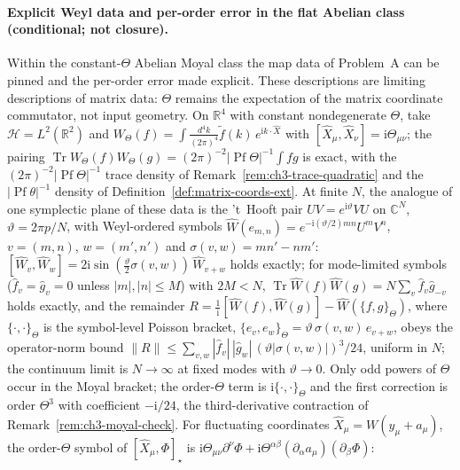 \paragraph{Explicit Weyl data and per-order error in the flat Abelian class (conditional; not closure).}
Within the constant-\(\Theta\) Abelian Moyal class the map data of Problem~A can be
pinned and the per-order error made explicit. These descriptions are limiting
descriptions of matrix data: \(\Theta\) remains the expectation of the matrix coordinate
commutator, not input geometry. On \(\mathbb R^4\) with constant nondegenerate
\(\Theta\), take \(\mathcal H=L^2(\mathbb R^2)\) and
\(W_\Theta(f)=\int\frac{d^4k}{(2\pi)^4}\tilde f(k)\,e^{\mathrm i k\cdot\hat X}\) with
\([\hat X_\mu,\hat X_\nu]=\mathrm i\Theta_{\mu\nu}\); the pairing
\(\operatorname{Tr}W_\Theta(f)W_\Theta(g)=(2\pi)^{-2}|\operatorname{Pf}\Theta|^{-1}\!\int fg\)
is exact, with the \((2\pi)^{-2}|\operatorname{Pf}\Theta|^{-1}\) trace density of
Remark~\ref{rem:ch3-trace-quadratic} and the \(|\operatorname{Pf}\theta|^{-1}\) density of
Definition~\ref{def:matrix-coords-ext}. At finite \(N\), the analogue of one symplectic
plane of these data is the 't~Hooft pair \(UV=e^{\mathrm i\vartheta}VU\) on
\(\mathbb C^N\), \(\vartheta=2\pi p/N\), with Weyl-ordered symbols
\(\widehat W(e_{m,n})=e^{-\mathrm i(\vartheta/2)mn}U^mV^n\), \(v=(m,n)\),
\(w=(m',n')\) and \(\sigma(v,w)=mn'-nm'\):
\([\widehat W_v,\widehat W_w]=2\mathrm i\sin(\tfrac{\vartheta}{2}\sigma(v,w))\,\widehat W_{v+w}\)
holds exactly; for mode-limited symbols (\(\hat f_v=\hat g_v=0\) unless
\(|m|,|n|\le M\)) with \(2M<N\),
\(\operatorname{Tr}\widehat W(f)\widehat W(g)=N\sum_v\hat f_v\hat g_{-v}\) holds exactly,
and the remainder
\(R=\tfrac1{\mathrm i}[\widehat W(f),\widehat W(g)]-\widehat W(\{f,g\}_\Theta)\), where
\(\{\cdot,\cdot\}_\Theta\) is the symbol-level Poisson bracket,
\(\{e_v,e_w\}_\Theta=\vartheta\,\sigma(v,w)\,e_{v+w}\), obeys the operator-norm bound
\(\|R\|\le\sum_{v,w}|\hat f_v|\,|\hat g_w|\,(\vartheta|\sigma(v,w)|)^3/24\), uniform in
\(N\); the continuum limit is \(N\to\infty\) at fixed modes with \(\vartheta\to0\). Only
odd powers of \(\Theta\) occur in the Moyal bracket; the order-\(\Theta\) term is
\(\mathrm i\{\cdot,\cdot\}_\Theta\) and the first correction is order \(\Theta^3\) with
coefficient \(-\mathrm i/24\), the third-derivative contraction of
Remark~\ref{rem:ch3-moyal-check}. For fluctuating coordinates
\(\hat X_\mu=W(y_\mu+a_\mu)\), the order-\(\Theta\) symbol of
\([\hat X_\mu,\Phi]_\star\) is
\(\mathrm i\Theta_{\mu\nu}\partial^\nu\Phi+\mathrm i\Theta^{\alpha\beta}(\partial_\alpha a_\mu)(\partial_\beta\Phi)\):
